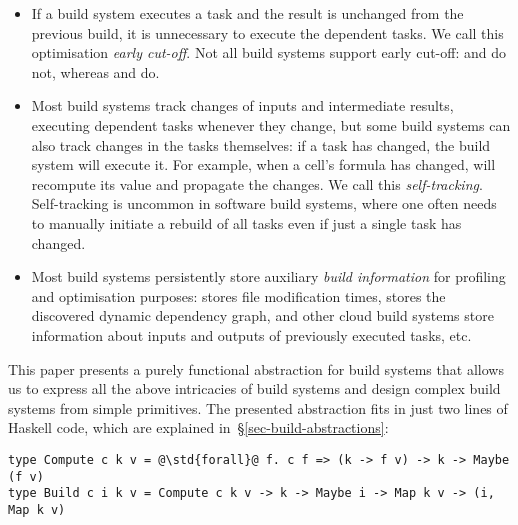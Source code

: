 \begin{itemize}
    \item If a build system executes a task and the result is unchanged from the
    previous build, it is unnecessary to execute the dependent tasks. We call
    this optimisation \emph{early cut-off}. Not all build systems support early
    cut-off: \Make and \Excel do not, whereas \Shake and \Buck do.

    \item Most build systems track changes of inputs and intermediate results,
    executing dependent tasks whenever they change, but some build systems can
    also track changes in the tasks themselves: if a task has changed, the build
    system will execute it. For example, when a cell's formula has changed,
    \Excel will recompute its value and propagate the changes. We call this
    \emph{self-tracking}. Self-tracking is uncommon in software build systems,
    where one often needs to manually initiate a rebuild of all tasks even if
    just a single task has changed.

    \item Most build systems persistently store auxiliary \emph{build
    information} for profiling and optimisation purposes: \Make stores file
    modification times, \Shake stores the discovered dynamic dependency graph,
    \Bazel and other cloud build systems store information about inputs and
    outputs of previously executed tasks, etc.
\end{itemize}

This paper presents a purely functional abstraction for build systems that
allows us to express all the above intricacies of build systems and design
complex build systems from simple primitives. The presented abstraction fits in
just two lines of Haskell code, which are explained
in~\S\ref{sec-build-abstractions}:

\begin{verbatim}
type Compute c k v = @\std{forall}@ f. c f => (k -> f v) -> k -> Maybe (f v)
type Build c i k v = Compute c k v -> k -> Maybe i -> Map k v -> (i, Map k v)
\end{verbatim}



